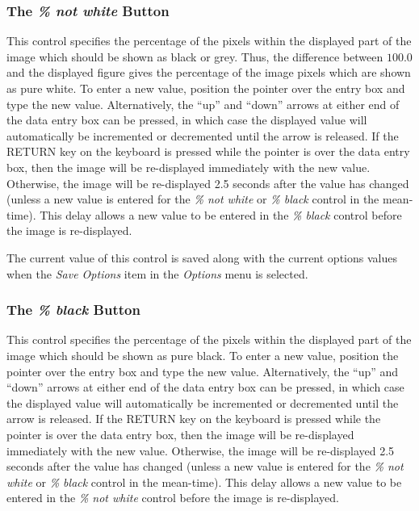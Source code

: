 \documentclass[11pt]{article}
\newcommand{\htmlref}[2]{#1}
\newcommand{\xlabel}[1]{}
\newcommand{\mylabel}[1] {\xlabel{#1}\label{#1}}
\begin{document}
\subsubsection {\mylabel{POLKA_NOT_WHITE}The \emph{\% not white} Button}
This control specifies the percentage of the pixels within the displayed
part of the image which should be shown as black or grey. Thus, the
difference between $100.0$ and the displayed figure gives the percentage
of the image pixels which are shown as pure white. To enter a new value,
position the pointer over the entry box and type the new value.
Alternatively, the ``up'' and ``down'' arrows at either end of the data
entry box can be pressed, in which case the displayed value will
automatically be incremented or decremented until the arrow is released.
If the RETURN key on the keyboard is pressed while the pointer is
over the data entry box, then the image will be re-displayed immediately
with the new value. Otherwise, the image will be re-displayed 2.5 seconds
after the value has changed (unless a new value is entered for the {\em
\% not white} or \htmlref{\emph{\% black}}{POLKA_BLACK} control in
the mean-time). This delay allows a new value to be entered in the {\em
\% black} control before the image is re-displayed.

The current value of this control is saved along with the current options
values when the \htmlref{\emph{Save Options}}{POLKA_SAVE_OPTIONS} item in
the \htmlref{\emph{Options}}{POLKA_OPTIONS_MENU} menu is selected.

\subsubsection {\mylabel{POLKA_BLACK}The \emph{\% black} Button}
This control specifies the percentage of the pixels within the displayed
part of the image which should be shown as pure black. To enter a new value,
position the pointer over the entry box and type the new value.
Alternatively, the ``up'' and ``down'' arrows at either end of the data
entry box can be pressed, in which case the displayed value will
automatically be incremented or decremented until the arrow is released.
If the RETURN key on the keyboard is pressed while the pointer is
over the data entry box, then the image will be re-displayed immediately
with the new value. Otherwise, the image will be re-displayed 2.5 seconds
after the value has changed (unless a new value is entered for the {\em
\% not white} or \htmlref{\emph{\% black}}{POLKA_BLACK} control in
the mean-time). This delay allows a new value to be entered in the {\em
\% not white} control before the image is re-displayed.
\end{document}
